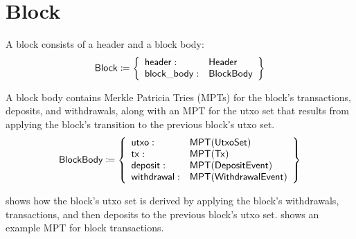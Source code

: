 \documentclass[../midgard.tex]{subfiles}
\begin{document}
\section{Block}
\label{h:block}

A block consists of a header and a block body:
\begin{equation*}
    \mathsf{Block} \coloneq \left\{
    \begin{array}{ll}
        \mathsf{header} : & \mathsf{Header} \\
        \mathsf{block\_body} : & \mathsf{BlockBody}
    \end{array} \right\}
\end{equation*}

A block body contains Merkle Patricia Tries (MPTs) for the block's transactions, deposits, and withdrawals, along with an MPT for the utxo set that results from applying the block's transition to the previous block's utxo set.
\begin{equation*}
    \mathsf{BlockBody} \coloneq \left\{
    \begin{array}{ll}
        \mathsf{utxo} : & \mathsf{MPT(UtxoSet)} \\
        \mathsf{tx} : & \mathsf{MPT(Tx)} \\
        \mathsf{deposit} : & \mathsf{MPT(DepositEvent)} \\
        \mathsf{withdrawal} : & \mathsf{MPT(WithdrawalEvent)} \\
    \end{array} \right\}
\end{equation*}

 shows how the block's utxo set is derived by applying the block's withdrawals, transactions, and then deposits to the previous block's utxo set.
 shows an example MPT for block transactions.
\end{document}
